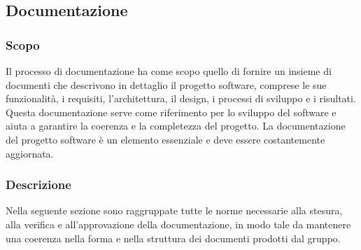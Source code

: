 \subsection{Documentazione}
\subsubsection{Scopo}
Il processo di documentazione ha come scopo quello di fornire un insieme di documenti che descrivono in dettaglio il progetto software, comprese le sue funzionalità, i requisiti, l'architettura, il design, i processi di sviluppo e i risultati. 
Questa documentazione serve come riferimento per lo sviluppo del software e aiuta a garantire la coerenza e la completezza del progetto. 
La documentazione del progetto software è un elemento essenziale e deve essere costantemente aggiornata.
\subsubsection{Descrizione}
Nella seguente sezione sono raggruppate tutte le norme necessarie alla stesura, alla verifica e 
all’approvazione della documentazione, in modo tale da mantenere una coerenza nella forma e nella 
struttura dei documenti prodotti dal gruppo.





